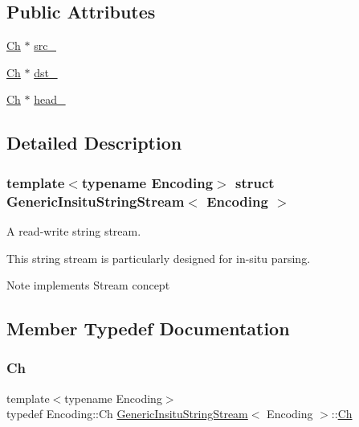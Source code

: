 \subsection*{Public Attributes}
\begin{DoxyCompactItemize}
\item 
\hyperlink{structGenericInsituStringStream_a277308a58f551f11d0d9a20823702b5a}{Ch} $\ast$ \hyperlink{structGenericInsituStringStream_af3cc551dd07fcca39db84459f4d4e718}{src\+\_\+}
\item 
\hyperlink{structGenericInsituStringStream_a277308a58f551f11d0d9a20823702b5a}{Ch} $\ast$ \hyperlink{structGenericInsituStringStream_ab0e7a73638a7a8db81aa9b26714b0e3b}{dst\+\_\+}
\item 
\hyperlink{structGenericInsituStringStream_a277308a58f551f11d0d9a20823702b5a}{Ch} $\ast$ \hyperlink{structGenericInsituStringStream_af5a7116bdd9bfde5141c298a5b7566b0}{head\+\_\+}
\end{DoxyCompactItemize}


\subsection{Detailed Description}
\subsubsection*{template$<$typename Encoding$>$\newline
struct Generic\+Insitu\+String\+Stream$<$ Encoding $>$}

A read-\/write string stream. 

This string stream is particularly designed for in-\/situ parsing. \begin{DoxyNote}{Note}
implements Stream concept 
\end{DoxyNote}


\subsection{Member Typedef Documentation}
\mbox{\label{structGenericInsituStringStream_a277308a58f551f11d0d9a20823702b5a}} 
\subsubsection{\texorpdfstring{Ch}{Ch}}
{\footnotesize\ttfamily template$<$typename Encoding$>$ \\
typedef Encoding\+::\+Ch \hyperlink{structGenericInsituStringStream}{Generic\+Insitu\+String\+Stream}$<$ Encoding $>$\+::\hyperlink{structGenericInsituStringStream_a277308a58f551f11d0d9a20823702b5a}{Ch}}



